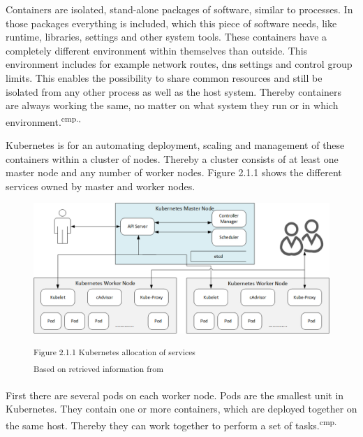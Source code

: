 
Containers are isolated, stand-alone packages of software, similar to processes. In those packages everything is included, which this piece of software needs, like runtime, libraries, settings and other system tools.  These containers have a completely different environment within themselves than outside. This environment includes for example network routes, dns settings and control group limits. This enables the possibility to share common resources and still be isolated from any other process as well as the host system. Thereby containers are always working the same, no matter on what system they run or in which environment.\textsuperscript{cmp.\cite{19}, \cite{20}}


Kubernetes is for an automating deployment, scaling and management of these containers within a cluster of nodes. Thereby a cluster consists of at least one master node and any number of worker nodes. Figure 2.1.1 shows the different services owned by master and worker nodes.

\begin{figure}[h]
\centering
\includegraphics[width=\textwidth/5*3]{images/kubernetes_service_allocation.png}

\textsuperscript{Figure 2.1.1 Kubernetes allocation of services}\\
\textsuperscript{Based on retrieved information from \cite{19}}
\end{figure}

First there are several pods on each worker node. Pods are the smallest unit in Kubernetes. They contain one or more containers, which are deployed together on the same host. Thereby they can work together to perform a set of tasks.\textsuperscript{cmp.\cite{21}}%

